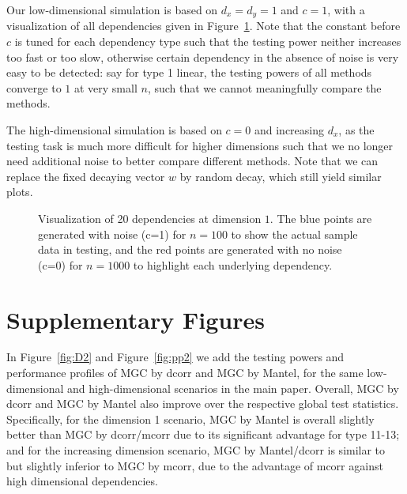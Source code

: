 \documentclass[11pt]{article}
\begin{document}
Our low-dimensional simulation is based on $d_{x}=d_{y}=1$ and $c=1$, with a visualization of all dependencies given in Figure~\ref{fig0}. Note that the constant before $c$ is tuned for each dependency type such that the testing power neither increases too fast or too slow, otherwise certain dependency in the absence of noise is very easy to be detected: say for type 1 linear, the testing powers of all methods converge to $1$ at very small $n$, such that we cannot meaningfully compare the methods.

The high-dimensional simulation is based on $c=0$ and increasing $d_{x}$, as the testing task is much more difficult for higher dimensions such that we no longer need additional noise to better compare different methods. Note that we can replace the fixed decaying vector $w$ by random decay, which still yield similar plots.

\begin{figure}[htbp]
\caption{Visualization of 20 dependencies at dimension $1$. The blue points are generated with noise (c=1) for $n=100$ to show the actual sample data in testing, and the red points are generated with no noise (c=0) for $n=1000$ to highlight each underlying dependency.}
\label{fig0}
\end{figure}

\section{Supplementary Figures}

In Figure~\ref{fig:D2} and Figure~\ref{fig:pp2} we add the testing powers and performance profiles of MGC by dcorr and MGC by Mantel, for the same low-dimensional and high-dimensional scenarios in the main paper. Overall, MGC by dcorr and MGC by Mantel also improve over the respective global test statistics. Specifically, for the dimension 1 scenario, MGC by Mantel is overall slightly better than MGC by dcorr/mcorr due to its significant advantage for type 11-13; and for the increasing dimension scenario, MGC by Mantel/dcorr is similar to but slightly inferior to MGC by mcorr, due to the advantage of mcorr against high dimensional dependencies.
\end{document}
